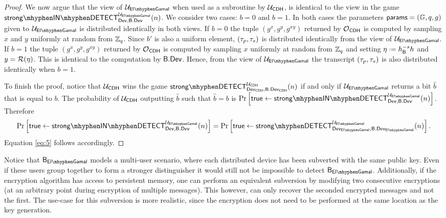 \begin{proof}
We now argue that the view of $\user_{\elGamal}$ when used as a subroutine by $\mathcal{U}_{\mathsf{CDH}}$, is identical to the view in the game $\instrongdetect{\dev}{\bbdev}{\user_{\elGamal}}$. We consider two cases: $b = 0$ and $b = 1$. In both cases the parameters $\mathsf{params} = (\mathbb{G},q,g)$ given to $\user_{\elGamal}$ is distributed identically in both views. If $b = 0$ the tuple $(g^x,g^y,g^{xy})$ returned by $\operatorname{\mathcal{O}}_{\mathsf{CDH}}$ is computed by sampling $x$ and $y$ uniformly at random from $\mathbb{Z}_q$. Since $b'$ is also a uniform element, $(\tau_p,\tau_s)$ is distributed identically from the view of $\user_{\elGamal}$. If $b = 1$ the tuple $(g^x,g^y,g^{xy})$ returned by $\operatorname{\mathcal{O}}_{\mathsf{CDH}}$ is computed by sampling $x$ uniformly at random from $\mathbb{Z}_q$ and setting $\eta \defeq h_{\bb}^{-s}h$ and $y=\operatorname{\mathcal{R}}(\eta)$. This is identical to the computation by $\mathsf{B}.\mathsf{Dev}$. Hence, from the view of $\user_{\elGamal}$ the transcript $(\tau_p,\tau_s)$ is also distributed identically when $b = 1$.

To finish the proof, notice that $\mathcal{U}_{\mathsf{CDH}}$ wins the game $\strongdetect{\dev_{\CDH}}{\bbdev_{\CDH}}{\user_{\CDH}}$ if and only if $\user_{\elGamal}$ returns a bit $\hat{b}$ that is equal to $b$. The probability of $\mathcal{U}_{\mathsf{CDH}}$ outputting $\hat{b}$ such that $\hat{b}=b$ is $\prob{\true\leftarrow\instrongdetect{\dev}{\bbdev}{\user_{\elGamal}}}$. Therefore
\begin{align*}
	\prob{\true\leftarrow\instrongdetect{\dev}{\bbdev}{\user_{\elGamal}}} = \prob{\true\leftarrow\strongdetect{\dev_{\elGamal}}{\bbdev_{\elGamal}}{\user_{\elGamal}}}.
\end{align*}
Equation \ref{eq:5} follows accordingly.
\end{proof}

Notice that $\bb_{\elGamal}$ models a multi-user scenario, where each distributed device has been subverted with the same public key. Even if these users group together to form a stronger distinguisher it would still not be impossible to detect $\bb_{\elGamal}$. Additionally, if the encryption algorithm has access to persistent memory, one can perform an equivalent subversion by modifying two consecutive encryptions (at an arbitrary point during encryption of multiple messages). This however, can only recover the seconded encrypted messages and not the first. The use-case for this subversion is more realistic, since the encryption does not need to be performed at the same location as the key generation. 

